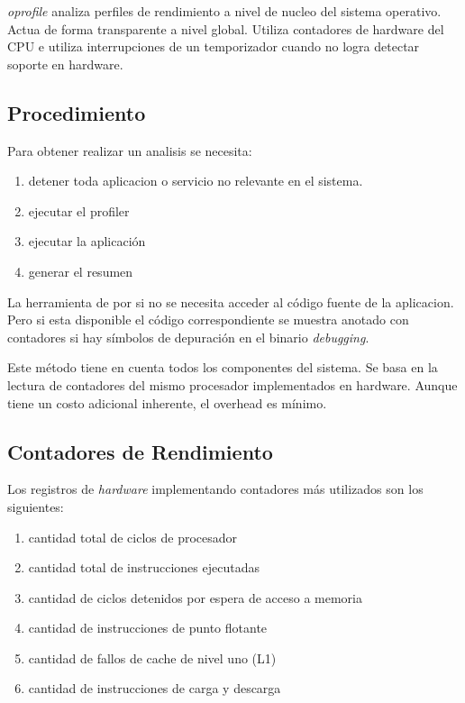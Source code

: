 \documentclass[a4paper]{report}
\begin{document}
{\it oprofile} analiza perfiles de rendimiento a nivel de nucleo del
sistema operativo. Actua de forma transparente a nivel global. Utiliza
contadores de hardware del CPU e utiliza interrupciones de un temporizador
cuando no logra detectar soporte en hardware.


\subsection{Procedimiento}

Para obtener realizar un analisis se necesita:

\begin{enumerate}

\item detener toda aplicacion o servicio no relevante en el sistema.

\item ejecutar el profiler

\item ejecutar la aplicaci\'on

\item generar el resumen

\end{enumerate}

La herramienta de por si no se necesita acceder al c\'odigo fuente de la aplicacion.
Pero si esta disponible el c\'odigo correspondiente se muestra anotado con contadores
si hay s\'imbolos de depuraci\'on en el binario {\it debugging}.

Este m\'etodo tiene en cuenta todos los componentes del sistema.
Se basa en la lectura de contadores del mismo procesador implementados en hardware.
Aunque tiene un costo adicional inherente, el overhead es m\'inimo.

\subsection{Contadores de Rendimiento}

Los registros de {\it hardware} implementando contadores m\'as utilizados son los
siguientes:

\begin{enumerate}
\item cantidad total de ciclos de procesador
\item cantidad total de instrucciones ejecutadas
\item cantidad de ciclos detenidos por espera de acceso a memoria
\item cantidad de instrucciones de punto flotante
\item cantidad de fallos de cache de nivel uno (L1)
\item cantidad de instrucciones de carga y descarga
\end{enumerate}
\end{document}

